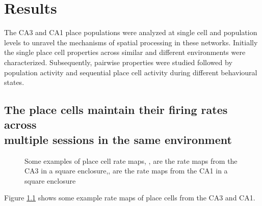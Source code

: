 \chapter{Results}
\label{results}

The CA3 and CA1 place populations were analyzed at single cell and population levels to unravel the mechanisms of spatial processing in these networks. Initially the single place cell properties across similar and different environments were characterized. Subsequently, pairwise properties were studied followed by population activity and sequential place cell activity during different behavioural states. \\ 


\section[Place cell firing in same environment]{The place cells maintain their firing rates across \\ multiple sessions in the same environment}


\begin{figure}[htb!]
\centering
{}
\caption[Rate maps]{Some examples of place cell rate maps, ,  are the rate maps from the CA3 in a square enclosure,,  are the rate maps from the CA1 in a square enclosure}
\label{fig:rm}
\end{figure}
Figure \ref{fig:rm} shows some example rate maps of place cells from the CA3 and CA1. 

